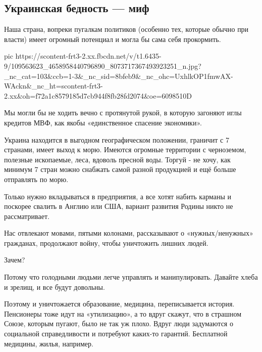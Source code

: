  
 
 
 
 


\subsection{Украинская бедность — миф}
\label{sec:16_07_2020.fb.zharkih_ekaterina.1.bednost_ukraina_mif}

Наша страна, вопреки пугалкам политиков (особенно тех, которые обычно при
власти) имеет огромный потенциал и могла бы сама себя прокормить. 


\ifcmt
  pic https://scontent-frt3-2.xx.fbcdn.net/v/t1.6435-9/109563623_4658958440796890_8073717367493923251_n.jpg?_nc_cat=103&ccb=1-3&_nc_sid=8bfeb9&_nc_ohc=UxhlkOP1fmwAX-WAckn&_nc_ht=scontent-frt3-2.xx&oh=f72a1c8579185d7cb944f8fb28fd2074&oe=6098510D
\fi

Мы могли бы не ходить вечно с протянутой рукой, в которую загоняют иглы
кредитов МВФ, как якобы «единственное спасение экономики». 

Украина находится в выгодном географическом положении, граничит с 7 странами,
имеет выход к морю. Имеются огромные территории с черноземом, полезные
ископаемые, леса, вдоволь пресной воды. Торгуй - не хочу, как минимум 7 стран
можно снабжать самой разной продукцией и ещё больше отправлять по морю. 

Только нужно вкладываться в предприятия, а все хотят набить карманы и поскорее
свалить в Англию или США, вариант развития Родины никто не рассматривает.

Нас отвлекают мовами, пятыми колонами, рассказывают о «нужных/ненужных»
гражданах, продолжают войну, чтобы уничтожить лишних людей. 

Зачем? 

Потому что голодными людьми легче управлять и манипулировать. Давайте хлеба и
зрелищ, и все будут довольны.

Поэтому и уничтожается образование, медицина, переписывается история.
Пенсионеры тоже идут на «утилизацию», а то вдруг скажут, что в страшном Союзе,
которым пугают, было не так уж плохо. Вдруг люди задумаются о социальной
справедливости и потребуют каких-то гарантий. Бесплатной медицины, жилья,
например. 

